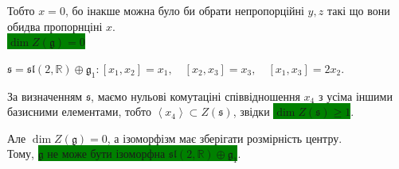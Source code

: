 \documentclass[10pt, a4paper]{article} %
\newcommand{\R}{\mathbb{R}}
\newcommand{\g}{\mathfrak{g}}
\begin{document}
Тобто $x = 0$, бо інакше можна було би обрати непропорційні $y,z$ такі що вони обидва пропорнціні $x$.\\
\colorbox{green}{$\dim Z(\g) = 0$}

\begin{mdframed}
    $\mathfrak{s} = \mathfrak{sl}(2,\R)\oplus \g_1 : [x_1,x_2]=x_1, \quad [x_2,x_3]=x_3, \quad [x_1,x_3]=2x_2.$
\end{mdframed}

За визначенням $\mathfrak{s}$, маємо нульові комутаціні співвідношення $x_4$ з усіма іншими базисними елементами, 
тобто $\left<x_4\right> \subset Z(\mathfrak s)$, звідки \colorbox{green}{$\dim Z(\mathfrak s) \ge 1$}.

Але $\dim Z(\g) = 0$, а ізоморфізм має зберігати розмірність центру. \\
Тому, \colorbox{green}{$\g$ не може бути ізоморфна $\mathfrak{sl}(2,\R)\oplus \g_1$}.
\end{document}
